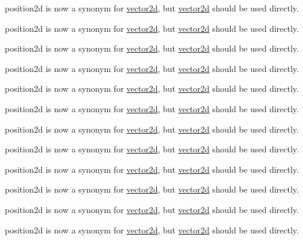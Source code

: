 \begin{DoxyRefList}
position2d is now a synonym for \hyperlink{classirr_1_1core_1_1vector2d}{vector2d}, but \hyperlink{classirr_1_1core_1_1vector2d}{vector2d} should be used directly. 

position2d is now a synonym for \hyperlink{classirr_1_1core_1_1vector2d}{vector2d}, but \hyperlink{classirr_1_1core_1_1vector2d}{vector2d} should be used directly.  
\item[\label{deprecated__deprecated000026}%
\Hypertarget{deprecated__deprecated000026}%
Member \hyperlink{namespaceirr_1_1core_ace0f1379db5f9f5660456ec57ab78202}{irr\+:\+:core\+:\+:position2di} ]position2d is now a synonym for \hyperlink{classirr_1_1core_1_1vector2d}{vector2d}, but \hyperlink{classirr_1_1core_1_1vector2d}{vector2d} should be used directly. 

position2d is now a synonym for \hyperlink{classirr_1_1core_1_1vector2d}{vector2d}, but \hyperlink{classirr_1_1core_1_1vector2d}{vector2d} should be used directly. 

position2d is now a synonym for \hyperlink{classirr_1_1core_1_1vector2d}{vector2d}, but \hyperlink{classirr_1_1core_1_1vector2d}{vector2d} should be used directly. 

position2d is now a synonym for \hyperlink{classirr_1_1core_1_1vector2d}{vector2d}, but \hyperlink{classirr_1_1core_1_1vector2d}{vector2d} should be used directly. 

position2d is now a synonym for \hyperlink{classirr_1_1core_1_1vector2d}{vector2d}, but \hyperlink{classirr_1_1core_1_1vector2d}{vector2d} should be used directly. 

position2d is now a synonym for \hyperlink{classirr_1_1core_1_1vector2d}{vector2d}, but \hyperlink{classirr_1_1core_1_1vector2d}{vector2d} should be used directly. 

position2d is now a synonym for \hyperlink{classirr_1_1core_1_1vector2d}{vector2d}, but \hyperlink{classirr_1_1core_1_1vector2d}{vector2d} should be used directly. 

position2d is now a synonym for \hyperlink{classirr_1_1core_1_1vector2d}{vector2d}, but \hyperlink{classirr_1_1core_1_1vector2d}{vector2d} should be used directly. 

position2d is now a synonym for \hyperlink{classirr_1_1core_1_1vector2d}{vector2d}, but \hyperlink{classirr_1_1core_1_1vector2d}{vector2d} should be used directly. 

position2d is now a synonym for \hyperlink{classirr_1_1core_1_1vector2d}{vector2d}, but \hyperlink{classirr_1_1core_1_1vector2d}{vector2d} should be used directly. 


\end{DoxyRefList}
